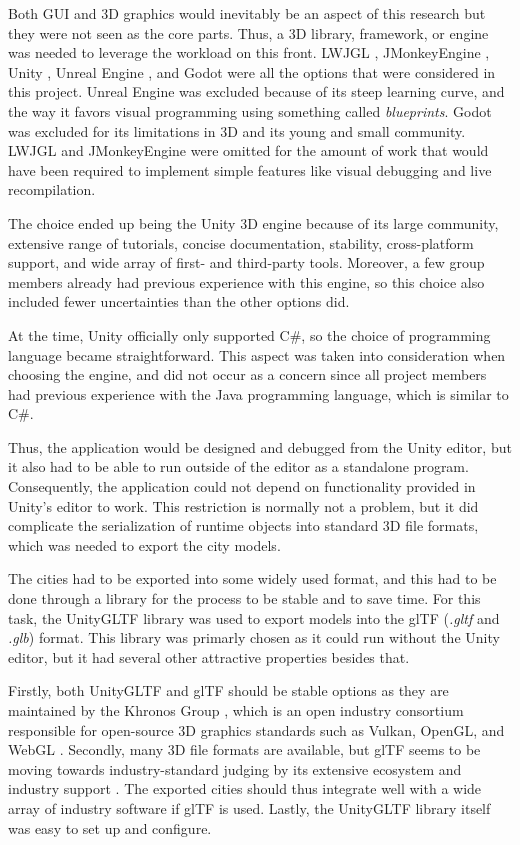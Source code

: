 Both GUI and 3D graphics would inevitably be an aspect of this research but they were not seen as the core parts.
Thus, a 3D library, framework, or engine was needed to leverage the workload on this front.
LWJGL \cite{lwjgl}, JMonkeyEngine \cite{jmonkey}, Unity \cite{unity}, Unreal Engine \cite{unreal}, and Godot \cite{godot} were all the options that were considered in this project.
Unreal Engine was excluded because of its steep learning curve, and the way it favors visual programming using something called \textit{blueprints}.
Godot was excluded for its limitations in 3D and its young and small community.
LWJGL and JMonkeyEngine were omitted for the amount of work that would have been required to implement simple features like visual debugging and live recompilation.

The choice ended up being the Unity 3D engine because of its large community, extensive range of tutorials, concise documentation, stability, cross-platform support, and wide array of first- and third-party tools.
Moreover, a few group members already had previous experience with this engine, so this choice also included fewer uncertainties than the other options did.

At the time, Unity officially only supported C\#, so the choice of programming language became straightforward.
This aspect was taken into consideration when choosing the engine, and did not occur as a concern since all project members had previous experience with the Java programming language, which is similar to C\#.

Thus, the application would be designed and debugged from the Unity editor, but it also had to be able to run outside of the editor as a standalone program.
Consequently, the application could not depend on functionality provided in Unity's editor to work.
This restriction is normally not a problem, but it did complicate the serialization of runtime objects into standard 3D file formats, which was needed to export the city models.

\newpage

The cities had to be exported into some widely used format, and this had to be done through a library for the process to be stable and to save time.
For this task, the UnityGLTF \cite{unity_gltf} library was used to export models into the glTF (\textit{.gltf} and \textit{.glb}) \cite{gltf} format.
This library was primarly chosen as it could run without the Unity editor, but it had several other attractive properties besides that.

Firstly, both UnityGLTF and glTF should be stable options as they are maintained by the Khronos Group \cite{unity_gltf} \cite{gltf}, which is an open industry consortium responsible for open-source 3D graphics standards such as Vulkan, OpenGL, and WebGL \cite{khronos_about}.
Secondly, many 3D file formats are available, but glTF seems to be moving towards industry-standard judging by its extensive ecosystem and industry support \cite{gltf}.
The exported cities should thus integrate well with a wide array of industry software if glTF is used.
Lastly, the UnityGLTF library itself was easy to set up and configure.

